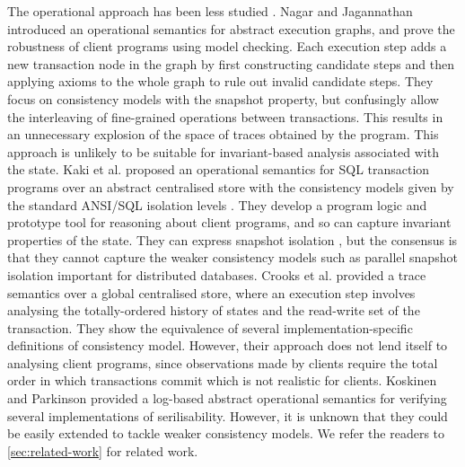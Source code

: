 The operational approach has been less studied
\cite{sureshConcur,alonetogether,seebelieve,push-pull}.  Nagar and
Jagannathan \citet{sureshConcur} introduced an operational semantics
for abstract execution graphs, and
prove the robustness of client programs using model checking. Each
execution step adds a new transaction node in the graph by first
constructing candidate steps and then applying axioms to the whole
graph to rule out invalid candidate steps.  They focus on consistency models with the snapshot property, but confusingly allow 
the interleaving of fine-grained operations between transactions. 
This results in an unnecessary explosion of the space of traces obtained by 
the program.
This approach is unlikely
to be suitable for invariant-based analysis associated with the
state.
Kaki et al. \citet{alonetogether} proposed an operational semantics for
SQL transaction programs over an abstract centralised store with the consistency
models given by the standard ANSI/SQL isolation levels \cite{si}. They
develop a program logic and prototype tool for reasoning about client
programs, and so can capture invariant properties of the state. They can
express snapshot isolation \cite{si}, but the consensus is
that they cannot
capture the weaker consistency models such as parallel snapshot isolation \cite{PSI} 
important for distributed databases. 
Crooks et al. \citet{seebelieve} provided a trace semantics
over a global centralised store, where an execution step involves
analysing the totally-ordered
history of states and the read-write set of the transaction.
They show the equivalence of several
implementation-specific definitions of consistency model. However, their
approach does not lend itself to  analysing client programs,
since observations made by clients require the total order in
which transactions commit which is not realistic for clients. 
Koskinen and Parkinson \citet{push-pull}
provided a log-based abstract operational semantics for verifying several implementations of serilisability.
However, it is unknown that they could be easily extended to tackle weaker consistency models.
We refer the readers to \cref{sec:related-work} for related work.


